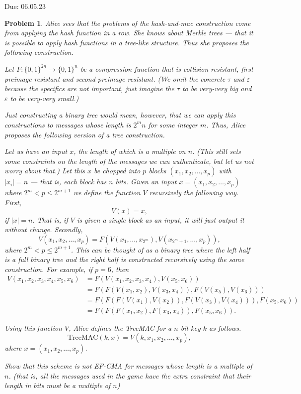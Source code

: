 \documentclass{../homework}
\newtheorem{problem}{Problem}
\begin{document}
{Due: 06.05.23}{\profname}{\myname}

\begin{problem}
    Alice sees that the problems of the hash-and-mac construction come from
    applying the hash function in a row. She knows about Merkle trees --- that
    it is possible to apply hash functions in a tree-like structure. Thus she
    proposes the following construction.
    
    Let $F:\{0,1\}^{2n} \rightarrow \{0,1\}^n$ be a compression function that
    is collision-resistant, first preimage resistant and second preimage
    resistant. (We omit the concrete $\tau$  and $\varepsilon$ because the
    specifics are not important, just imagine the $\tau$ to be very-very big
    and $\varepsilon$ to be very-very small.)
    
    Just constructing a binary tree would mean, however, that we can apply this
    constructions to messages whose length is $2^mn$ for some integer $m$.
    Thus, Alice proposes the following version of a tree construction.
    
    Let us have an input $x$, the length of which is a multiple on $n$. (This
    still sets some constraints on the length of the messages we can
    authenticate, but let us not worry about that.) Let this $x$ be chopped
    into $p$ blocks $(x_1,x_2,\dots,x_p)$ with $|x_i|=n$ --- that is, each
    block has $n$ bits. Given an input $x=(x_1,x_2,\dots,x_p)$ where
    $2^m<p\leq 2^{m+1}$ we define the function $V$ recursively the following
    way. First,
    $$
        V(x)=x,
    $$
    if $|x|=n$. That is, if $V$ is given a single block as an input, it will
    just output it without change. Secondly,
    $$
        V(x_1,x_2,\dots,x_p)=
        F(V(x_1,\dots,x_{2^{m}}),V(x_{2^{m}+1},\dots,x_p)),
    $$
    where $2^m<p\leq 2^{m+1}$. This can be thought of as a binary tree where
    the left half is a full binary tree and the right half is constructed
    recursively  using the same construction. For example, if $p=6$, then
    \begin{align*}
        V(x_1,x_2,x_3,x_4,x_5,x_6) &= F(V(x_1,x_2,x_3,x_4),V(x_5,x_6))\\
        &= F(F(V(x_1,x_2),V(x_3,x_4)), F(V(x_5),V(x_6)))\\
        &= F(F(F(V(x_1),V(x_2)), F(V(x_3),V(x_4))), F(x_5,x_6))\\
        &= F(F(F(x_1,x_2), F(x_3,x_4)), F(x_5,x_6)).
    \end{align*}
    
    Using this function $V$, Alice defines the TreeMAC for a $n$-bit key $k$ as
    follows.
    $$\text{TreeMAC}(k,x)=V(k,x_1,x_2,\dots,x_p),$$
    where $x=(x_1,x_2,\dots,x_p)$.
    
    Show that this scheme is not EF-CMA for messages whose length is a multiple
    of $n$. (that is, all the messages used in the game have the extra
    constraint that their length in bits must be a multiple of $n$)
\end{problem}
\end{document}

